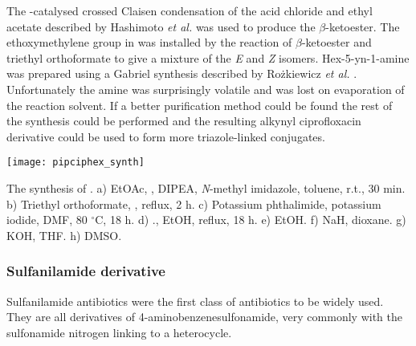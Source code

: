 The -catalysed crossed Claisen condensation of the acid chloride  and ethyl acetate described by Hashimoto \textit{et al.} \cite{Hashimoto2006} was used to produce the $\beta$-ketoester.
The ethoxymethylene group in  was installed by the reaction of $\beta$-ketoester  and triethyl orthoformate to give a mixture of the \textit{E} and \textit{Z} isomers\cite{Senthilkumar2009,Mitscher1986}.
Hex-5-yn-1-amine  was prepared using a Gabriel synthesis \cite{Gabriel1887} described by Rożkiewicz \textit{et al.} \cite{Rozkiewicz2006}. Unfortunately the amine was surprisingly volatile and was lost on evaporation of the reaction solvent. If a better purification method could be found the rest of the synthesis could be performed and the resulting alkynyl ciprofloxacin derivative  could be used to form more triazole-linked conjugates.

\begin{scheme}[H]
	\begin{center}
		\texttt{[image: pipciphex\_synth]}
		\caption{The synthesis of .
		a) EtOAc, , DIPEA, \textit{N}-methyl imidazole, toluene, r.t., 30 min.
		b) Triethyl orthoformate, , reflux, 2 h.
		c) Potassium phthalimide, potassium iodide, DMF, 80 $^{\circ}$C, 18 h.
		d) ., EtOH, reflux, 18 h.
		e) EtOH.
		f) NaH, dioxane.
		g) KOH, THF.
		h) DMSO.
		\label{sch:pipciphex_synth}}
	\end{center}
\end{scheme}

\subsubsection{Sulfanilamide derivative}

Sulfanilamide antibiotics were the first class of antibiotics to be widely used\cite{Otten1986,Wainwright2011}. They are all derivatives of 4-aminobenzenesulfonamide, very commonly with the sulfonamide nitrogen linking to a heterocycle.

